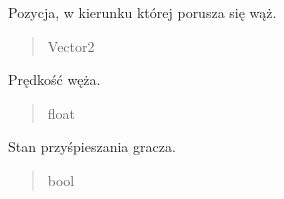 \documentclass[letterpaper,10pt,polish]{sphinxmanual}
\begin{document}
\begin{fulllineitems}
\begin{fulllineitems}
\begin{quote}
\begin{description}
\end{description}\end{quote}

\end{fulllineitems}


\begin{fulllineitems}
\label{\detokenize{snake:snake.Snake.dest}}
\pysigstartsignatures
{}
\pysigstopsignatures
\sphinxAtStartPar
Pozycja, w kierunku której porusza się wąż.
\begin{quote}\begin{description}
\sphinxAtStartPar
Vector2

\end{description}\end{quote}

\end{fulllineitems}


\begin{fulllineitems}
\label{\detokenize{snake:snake.Snake.speed}}
\pysigstartsignatures
{}
\pysigstopsignatures
\sphinxAtStartPar
Prędkość węża.
\begin{quote}\begin{description}
\sphinxAtStartPar
float

\end{description}\end{quote}

\end{fulllineitems}


\begin{fulllineitems}
\label{\detokenize{snake:snake.Snake.is_speeding}}
\pysigstartsignatures
{}
\pysigstopsignatures
\sphinxAtStartPar
Stan przyśpieszania gracza.
\begin{quote}\begin{description}
\sphinxAtStartPar
bool

\end{description}\end{quote}


\end{fulllineitems}
\end{fulllineitems}
\end{document}
